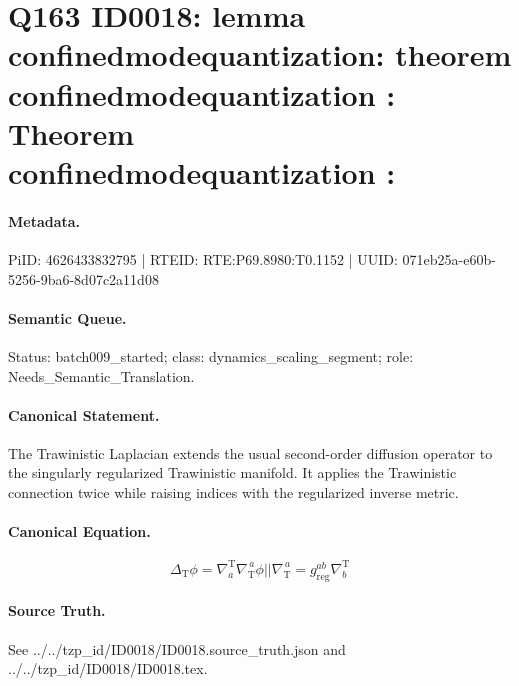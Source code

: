 \section*{Q163 ID0018: lemma confinedmodequantization: theorem confinedmodequantization : Theorem confinedmodequantization :}
\paragraph{Metadata.}
PiID: 4626433832795 | RTEID: RTE:P69.8980:T0.1152 | UUID: 071eb25a-e60b-5256-9ba6-8d07c2a11d08

\paragraph{Semantic Queue.}
Status: batch009\_started; class: dynamics\_scaling\_segment; role: Needs\_Semantic\_Translation.

\paragraph{Canonical Statement.}
The Trawinistic Laplacian extends the usual second-order diffusion operator to the singularly regularized Trawinistic manifold. It applies the Trawinistic connection twice while raising indices with the regularized inverse metric.

\paragraph{Canonical Equation.}
\[
\Delta_{\mathrm{T}}\phi = \nabla^{\mathrm{T}}_{a} \nabla_{\mathrm{T}}^{\,a}\phi || \nabla_{\mathrm{T}}^{\,a} = g_{\mathrm{reg}}^{ab}\nabla^{\mathrm{T}}_{b}
\]

\paragraph{Source Truth.}
See ../../tzp\_id/ID0018/ID0018.source\_truth.json and ../../tzp\_id/ID0018/ID0018.tex.
